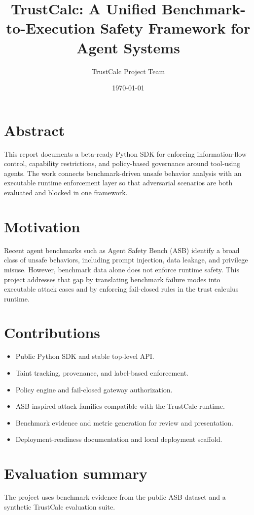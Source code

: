 \documentclass[11pt]{article}
\title{TrustCalc: A Unified Benchmark-to-Execution Safety Framework for Agent Systems}
\author{TrustCalc Project Team}
\date{\today}
\begin{document}
\maketitle

\section{Abstract}
This report documents a beta-ready Python SDK for enforcing information-flow control, capability restrictions, and policy-based governance around tool-using agents. The work connects benchmark-driven unsafe behavior analysis with an executable runtime enforcement layer so that adversarial scenarios are both evaluated and blocked in one framework.

\section{Motivation}
Recent agent benchmarks such as Agent Safety Bench (ASB) identify a broad class of unsafe behaviors, including prompt injection, data leakage, and privilege misuse. However, benchmark data alone does not enforce runtime safety. This project addresses that gap by translating benchmark failure modes into executable attack cases and by enforcing fail-closed rules in the trust calculus runtime.

\section{Contributions}
\begin{itemize}
    \item Public Python SDK and stable top-level API.
    \item Taint tracking, provenance, and label-based enforcement.
    \item Policy engine and fail-closed gateway authorization.
    \item ASB-inspired attack families compatible with the TrustCalc runtime.
    \item Benchmark evidence and metric generation for review and presentation.
    \item Deployment-readiness documentation and local deployment scaffold.
\end{itemize}

\section{Evaluation summary}
The project uses benchmark evidence from the public ASB dataset and a synthetic TrustCalc evaluation suite.
\end{document}
